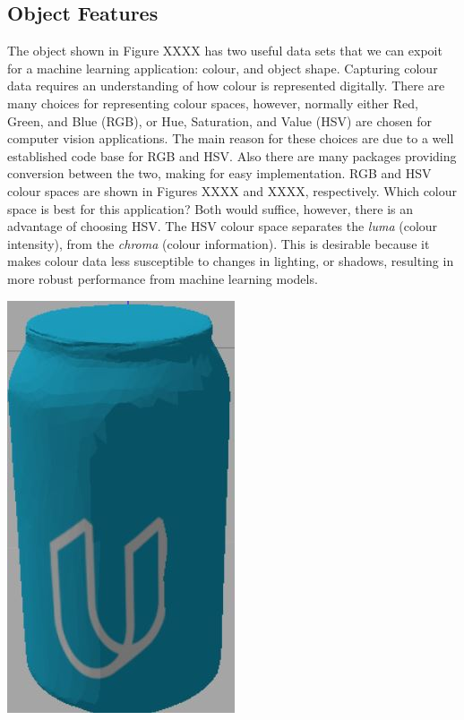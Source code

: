 \documentclass[a4paper]{article}
\begin{document}
\subsection{Object Features}
\begin{minipage}{0.66\textwidth}
The object shown in Figure XXXX has two useful data sets that we can expoit for a machine learning application: colour, and object shape. Capturing colour data requires an understanding of how colour is represented digitally. There are many choices for representing colour spaces, however, normally either Red, Green, and Blue (RGB), or Hue, Saturation, and Value (HSV) are chosen for computer vision applications. The main reason for these choices are due to a well established code base for RGB and HSV. Also there are many packages providing conversion between the two, making for easy implementation. RGB and HSV colour spaces are shown in Figures XXXX and XXXX, respectively. Which colour space is best for this application? Both would suffice, however, there is an advantage of choosing HSV. The HSV colour space separates the \textit{luma} (colour intensity), from the \textit{chroma} (colour information). This is desirable because it makes colour data less susceptible to changes in lighting, or shadows, resulting in more robust performance from machine learning models.
\end{minipage}
\begin{minipage}{0.33\textwidth}
		\centering
		\includegraphics[scale=0.5]{can_image}
\end{minipage}
	
\end{document}
